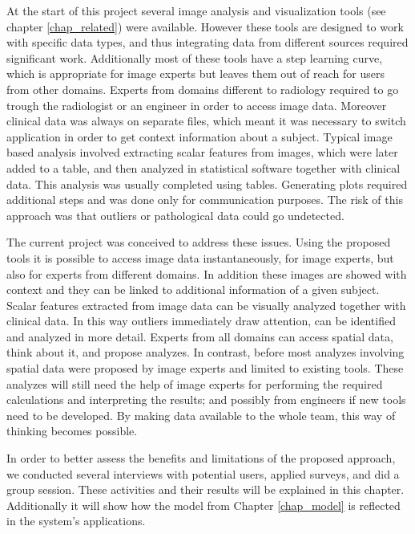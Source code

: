 

At the start of this project several image analysis and visualization tools (see chapter \ref{chap_related}) were available. However these tools are designed to work with specific data types, and thus integrating data from different sources required significant work. Additionally most of these tools have a step learning curve, which is appropriate for image experts but leaves them out of reach for users from other domains. Experts from domains different to radiology required to go trough the radiologist or an engineer in order to access image data. Moreover clinical data was always on separate files, which meant it was necessary to switch application in order to get context information about a subject. Typical image based analysis involved extracting scalar features from images, which were later added to a table, and then analyzed in statistical software together with clinical data. This analysis was usually completed using tables. Generating plots required additional steps and was done only for communication purposes. The risk of this approach was that outliers or pathological data could go undetected. 

The current project was conceived to address these issues. Using the proposed tools it is possible to access image data instantaneously,  for image experts, but also for experts from different domains. In addition these images are showed with context and they can be linked to additional information of a given subject. Scalar features extracted from image data can be visually analyzed together with clinical data. In this way outliers immediately draw attention, can be identified and analyzed in more detail. Experts from all domains can access spatial data, think about it, and propose analyzes. In contrast, before most analyzes involving spatial data were proposed by image experts and limited to existing tools. These analyzes will still need the help of image experts for performing the required calculations and interpreting the results; and possibly from engineers if new tools need to be developed. By making data available to the whole team, this way of thinking becomes possible.    

In order to better assess the benefits and limitations of the proposed approach, we conducted several interviews with potential users, applied surveys, and did a group session. These activities and their results will be explained in this chapter. Additionally it will show how the model from Chapter \ref{chap_model} is reflected in the system's applications.	

